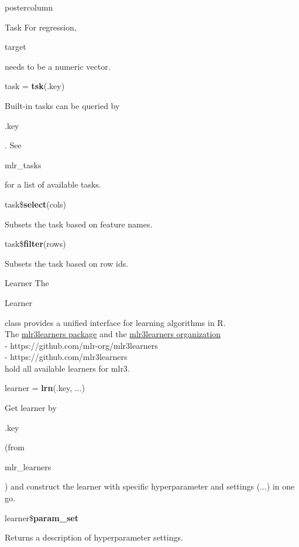 \documentclass{beamer}
\newcommand{\codeinline}[1]{\begin{codeboxinline}#1\end{codeboxinline}}
\begin{document}
\begin{frame}[fragile]{}
\begin{columns}
\begin{column}{.245\textwidth}
\begin{beamercolorbox}[center]{postercolumn}
\begin{minipage}{.98\textwidth}
{\begin{myblock}{Task}
							For regression, \codeinline{target} needs to be a numeric vector.
							\\
							\begin{codebox}
								task = \textbf{tsk}(.key)
							\end{codebox}
							Built-in tasks can be queried by \codeinline{.key}.
							See \codeinline{mlr\_tasks} for a list of available tasks.
							\vspace{1em}
							\\
							\begin{codebox}
								task\$\textbf{select}(cols)
							\end{codebox}
							Subsets the task based on feature names.
							\\
							\begin{codebox}
								task\$\textbf{filter}(rows)
							\end{codebox}
							Subsets the task based on row ids.
						\end{myblock}
						\begin{myblock}{Learner}
						The \codeinline{Learner} class provides a unified interface for
						learning algorithms in R. 
						\\The \href{https://github.com/mlr-org/mlr3learners}{mlr3learners
						package} and the \href{https://github.com/mlr3learners}{mlr3learners
						organization} \\
						- https://github.com/mlr-org/mlr3learners \\
						- https://github.com/mlr3learners \\
						hold all available learners for {mlr3}.
						\vspace{1em}
						\\
						\begin{codebox}
							learner = \textbf{lrn}(.key, ...)
						\end{codebox}
						Get learner by \codeinline{.key} (from \codeinline{mlr\_learners}) and construct the learner with specific hyperparameter and settings (...) in one go.
						\\
						\vspace{1em}
						\begin{codebox}
							learner\$\textbf{param\_set}
						\end{codebox}
						Returns a description of hyperparameter settings.
					\end{myblock}
						\vfill
					}
				\end{minipage}
			\end{beamercolorbox}

\end{column}
\end{columns}
\end{frame}
\end{document}
